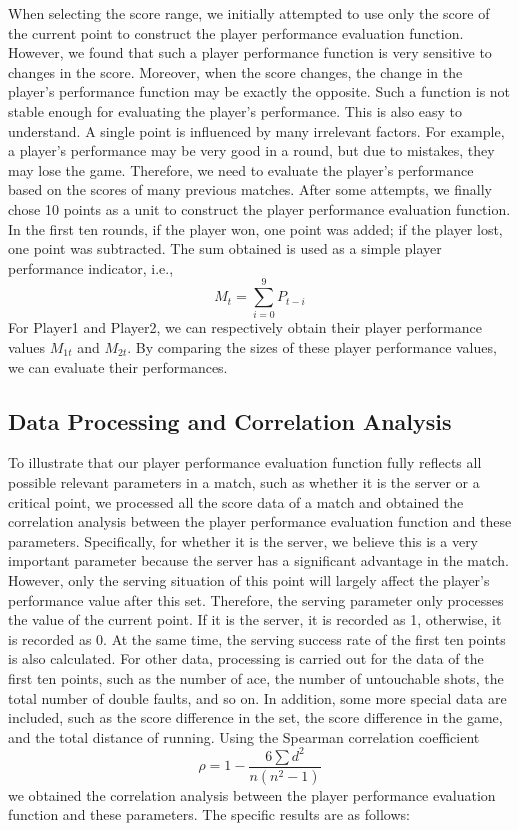 \documentclass[UTF8]{ctexart} %
\begin{document}
When selecting the score range, we initially attempted to use only the score of the current point to construct the player 
performance evaluation function. However, we found that such a player performance function is very sensitive to changes in the 
score. Moreover, when the score changes, the change in the player's performance function may be exactly the opposite. Such 
a function is not stable enough for evaluating the player's performance. This is also easy to understand. A single point is 
influenced by many irrelevant factors. For example, a player's performance may be very good in a round, but due to mistakes, 
they may lose the game. Therefore, we need to evaluate the player's performance based on the scores of many previous matches. 
After some attempts, we finally chose 10 points as a unit to construct the player performance evaluation function. In the 
first ten rounds, if the player won, one point was added; if the player lost, one point was subtracted. The sum 
obtained is used as a simple player performance indicator, i.e., $$M_t = \sum_{i=0}^{9} P_{t-i}$$For Player1 and Player2, 
we can respectively obtain their player performance values $M_{1t}$ and $M_{2t}$. By comparing the sizes of these player 
performance values, we can evaluate their performances.

\subsection{\textbf{Data Processing and Correlation Analysis}}

To illustrate that our player performance evaluation function fully reflects all possible relevant parameters in a match, 
such as whether it is the server or a critical point, we processed all the score data of a match and obtained the 
correlation analysis between the player performance evaluation function and these parameters. Specifically, for whether 
it is the server, we believe this is a very important parameter because the server has a significant advantage in the 
match. However, only the serving situation of this point will largely affect the player's performance value after this set. 
Therefore, the serving parameter only processes the value of the current point. If it is the server, it is recorded as 1, 
otherwise, it is recorded as 0. At the same time, the serving success rate of the first ten points is also calculated. 
For other data, processing is carried out for the data of the first ten points, such as the number of ace, 
the number of untouchable shots, the total number of double faults, and so on. In addition, some more special data are 
included, such as the score difference in the set, the score difference in the game, and the total distance of 
running. Using the Spearman correlation coefficient $$\rho = 1- \frac{6\sum d^2}{n(n^2-1)}$$we obtained the correlation 
analysis between the player performance evaluation function and these parameters. The specific results are as follows:
\end{document}
